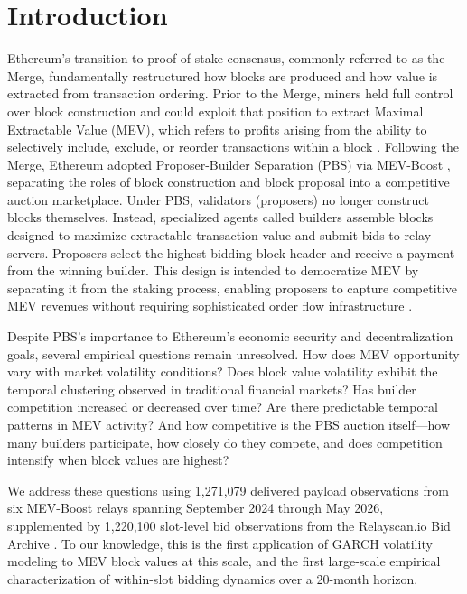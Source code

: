 \documentclass[11pt]{article}
\begin{document}
\newpage
\tableofcontents
\newpage

\section{Introduction}
\label{sec:intro}

Ethereum's transition to proof-of-stake consensus, commonly referred to as the
Merge, fundamentally restructured how blocks are produced and how value is
extracted from transaction ordering. Prior to the Merge, miners held full
control over block construction and could exploit that position to extract
Maximal Extractable Value (MEV), which refers to profits arising from the
ability to selectively include, exclude, or reorder transactions within a block
\citep{daian2020}. Following the Merge, Ethereum adopted Proposer-Builder
Separation (PBS) via MEV-Boost \citep{flashbots2022}, separating the roles of
block construction and block proposal into a competitive auction marketplace.
Under PBS, validators (proposers) no longer construct blocks themselves.
Instead, specialized agents called builders assemble blocks designed to maximize
extractable transaction value and submit bids to relay servers. Proposers select
the highest-bidding block header and receive a payment from the winning builder.
This design is intended to democratize MEV by separating it from the staking
process, enabling proposers to capture competitive MEV revenues without
requiring sophisticated order flow infrastructure \citep{buterin2021}.

Despite PBS's importance to Ethereum's economic security and decentralization
goals, several empirical questions remain unresolved. How does MEV opportunity
vary with market volatility conditions? Does block value volatility exhibit the
temporal clustering observed in traditional financial markets? Has builder
competition increased or decreased over time? Are there predictable temporal
patterns in MEV activity? And how competitive is the PBS auction itself---how
many builders participate, how closely do they compete, and does competition
intensify when block values are highest?

We address these questions using 1,271,079 delivered payload observations from
six MEV-Boost relays spanning September 2024 through May 2026, supplemented by
1,220,100 slot-level bid observations from the Relayscan.io Bid Archive
\citep{relayscan2024}. To our knowledge, this is the first application of GARCH
volatility modeling to MEV block values at this scale, and the first
large-scale empirical characterization of within-slot bidding dynamics over a
20-month horizon.
\end{document}
